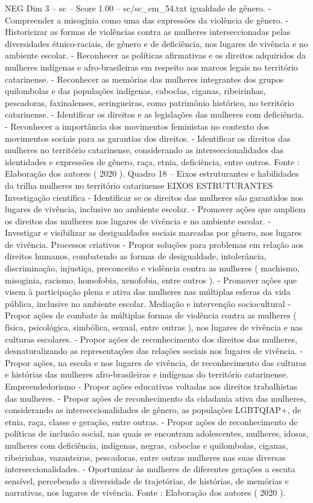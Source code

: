 \begin{textsample}{NEG Dim 3 – sc – Score 1.00 – sc/sc\_em\_54.txt}
igualdade de gênero. - Compreender a misoginia como uma das expressões da violência de gênero. - Historicizar as formas de violências contra as mulheres interseccionadas pelas diversidades étnico-raciais, de gênero e de deficiência, nos lugares de vivência e no ambiente escolar. - Reconhecer as políticas afirmativas e os direitos adquiridos da mulheres indígenas e afro-brasileiras em respeito aos marcos legais no território catarinense. - Reconhecer as memórias das mulheres integrantes dos grupos quilombolas e das populações indígenas, caboclas, ciganas, ribeirinhas, pescadoras, faxinalenses, seringueiras, como patrimônio histórico, no território catarinense. - Identificar os direitos e as legislações das mulheres com deficiência. - Reconhecer a importância dos movimentos feministas no contexto dos movimentos sociais para as garantias dos direitos. - Identificar os direitos das mulheres no território catarinense, considerando as interseccionalidades das identidades e expressões de gênero, raça, etnia, deficiência, entre outros.
Fonte : Elaboração dos autores ( 2020 ).
Quadro 18 – Eixos estruturantes e habilidades da trilha mulheres no território catarinense EIXOS ESTRUTURANTES Investigação científica - Identificar se os direitos das mulheres são garantidos nos lugares de vivência, inclusive no ambiente escolar. - Promover ações que ampliem os direitos das mulheres nos lugares de vivência e no ambiente escolar. - Investigar e visibilizar as desigualdades sociais marcadas por gênero, nos lugares de vivência.
Processos criativos - Propor soluções para problemas em relação aos direitos humanos, combatendo as formas de desigualdade, intolerância, discriminação, injustiça, preconceito e violência contra as mulheres ( machismo, misoginia, racismo, homofobia, xenofobia, entre outros ). - Promover ações que visem à participação plena e ativa das mulheres nas múltiplas esferas da vida pública, inclusive no ambiente escolar.
Mediação e intervenção sociocultural - Propor ações de combate às múltiplas formas de violência contra as mulheres ( física, psicológica, simbólica, sexual, entre outras ), nos lugares de vivência e nas culturas escolares. - Propor ações de reconhecimento dos direitos das mulheres, desnaturalizando as representações das relações sociais nos lugares de vivência. - Propor ações, na escola e nos lugares de vivência, de reconhecimento das culturas e histórias das mulheres afro-brasileiras e indígenas do território catarinense.
Empreendedorismo - Propor ações educativas voltadas aos direitos trabalhistas das mulheres. - Propor ações de reconhecimento da cidadania ativa das mulheres, considerando as interseccionalidades de gênero, as populações LGBTQIAP+, de etnia, raça, classe e geração, entre outras. - Propor ações de reconhecimento de políticas de inclusão social, nas quais se encontram adolescentes, mulheres, idosas, mulheres com deficiência, indígenas, negras, caboclas e quilombolas, ciganas, ribeirinhas, vazanteiras, pescadoras, entre outras mulheres nas suas diversas interseccionalidades. - Oportunizar às mulheres de diferentes gerações a escuta sensível, percebendo a diversidade de trajetórias, de histórias, de memórias e narrativas, nos lugares de vivência.
Fonte : Elaboração dos autores ( 2020 ).

\end{textsample}
